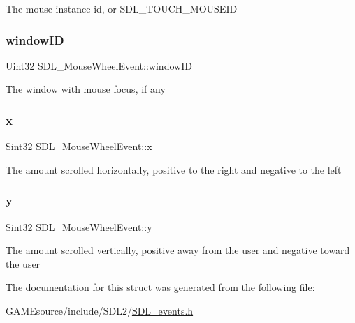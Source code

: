The mouse instance id, or S\+D\+L\+\_\+\+T\+O\+U\+C\+H\+\_\+\+M\+O\+U\+S\+E\+ID \mbox{\label{struct_s_d_l___mouse_wheel_event_ab45eb1895217214ecb773fc555e08f6c}} 
\subsubsection{\texorpdfstring{window\+ID}{windowID}}
{\footnotesize\ttfamily Uint32 S\+D\+L\+\_\+\+Mouse\+Wheel\+Event\+::window\+ID}

The window with mouse focus, if any \mbox{\label{struct_s_d_l___mouse_wheel_event_a6d904eef474ea45a5b1828fcb5b0f859}} 
\subsubsection{\texorpdfstring{x}{x}}
{\footnotesize\ttfamily Sint32 S\+D\+L\+\_\+\+Mouse\+Wheel\+Event\+::x}

The amount scrolled horizontally, positive to the right and negative to the left \mbox{\label{struct_s_d_l___mouse_wheel_event_a53fdf77a464426bc8b30e629795f044b}} 
\subsubsection{\texorpdfstring{y}{y}}
{\footnotesize\ttfamily Sint32 S\+D\+L\+\_\+\+Mouse\+Wheel\+Event\+::y}

The amount scrolled vertically, positive away from the user and negative toward the user 

The documentation for this struct was generated from the following file\+:\begin{DoxyCompactItemize}
\item 
G\+A\+M\+Esource/include/\+S\+D\+L2/\mbox{\hyperlink{_s_d_l__events_8h}{S\+D\+L\+\_\+events.\+h}}\end{DoxyCompactItemize}
